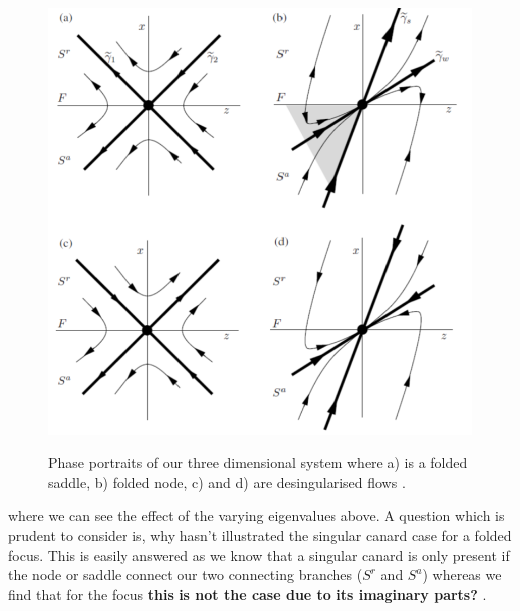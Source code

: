 \begin{figure}[h!]\centering
	\includegraphics[height=12cm,width=12cm]{Images/foldednodesetc}
	\caption{Phase portraits of our three dimensional system where a) is a folded saddle, b) folded node, c) and d) are desingularised flows \citep{MMO}.}
	\label{fig: folded singularities}
\end{figure}
where we can see the effect of the varying eigenvalues above. A question which is prudent to consider is, why hasn't \citep{MMO} illustrated the singular canard case for a folded focus. This is easily answered as we know that a singular canard is only present if the node or saddle connect our two connecting branches ($ S^r $ and $ S^a $) whereas we find that for the focus \textbf{this is not the case due to its imaginary parts?} \citep{MMO}.
